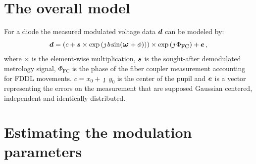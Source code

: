 \documentclass[a4paper,11pt,twoside]{scrartcl}
\begin{document}


\section{The overall model}
For a  diode the measured modulated voltage data $\boldsymbol{d}$ can be modeled by:
\begin{equation}
    \boldsymbol{d} = \left( c + \boldsymbol{s} \times  \exp\left( \jmath \, b \sin\large( \boldsymbol{\omega} + \phi\large)\right)\right)\times\exp\left(\jmath\,\Phi_\textrm{FC}\right)+  \boldsymbol{e}\,,\label{eq:model}
\end{equation}
where $\times$ is the element-wise multiplication, $\boldsymbol{s}$ is the sought-after demodulated  metrology signal, $\Phi_\textrm{FC}$ is the phase of the fiber coupler measurement accounting for FDDL movements. $c  = x_0 + \jmath\,y_0$ is the center of the pupil and $\boldsymbol{e}$ is a vector representing the errors on the measurement that are supposed Gaussian centered, independent and identically distributed.



\section{ Estimating the modulation parameters}
\end{document}
